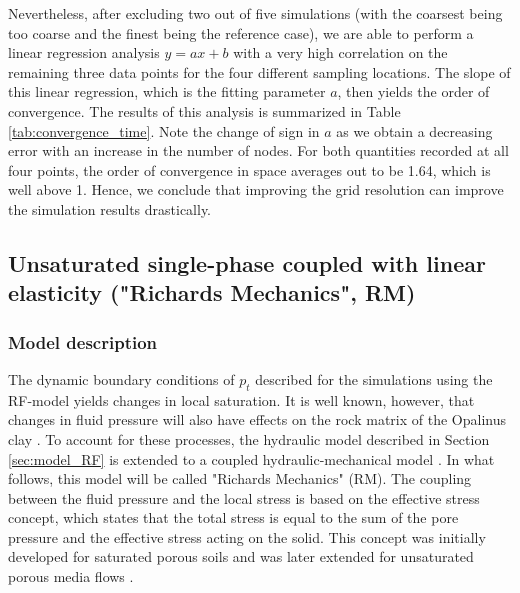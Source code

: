 Nevertheless, after excluding two out of five simulations (with the coarsest being too coarse and the finest being the reference case), we are able to perform a linear regression analysis $y = ax + b$ with a very high correlation on the remaining three data points for the four different sampling locations. The slope of this linear regression, which is the fitting parameter $a$, then yields the order of convergence. The results of this analysis is summarized in Table \ref{tab:convergence_time}. Note the change of sign in $a$ as we obtain a decreasing error with an increase in the number of nodes. For both quantities recorded at all four points, the order of convergence in space averages out to be 1.64, which is well above 1. Hence, we conclude that improving the grid resolution can improve the simulation results drastically.

\subsection{Unsaturated single-phase coupled with linear elasticity ("Richards Mechanics", RM)}\label{sec:RM}
\subsubsection{Model description}\label{sec:model_RM}
The dynamic boundary conditions of $p_t$ described for the simulations using the RF-model yields changes in local saturation. It is well known, however, that changes in fluid pressure will also have effects on the rock matrix of the Opalinus clay \cite{wild2017}. To account for these processes, the hydraulic model described in Section \ref{sec:model_RF} is extended to a coupled hydraulic-mechanical model \cite{lewis1998}. In what follows, this model will be called "Richards Mechanics" (RM). The coupling between the fluid pressure and the local stress is based on the effective stress concept, which states that the total stress is equal to the sum of the pore pressure and the effective stress acting on the solid. This concept was initially developed for saturated porous soils\cite{biot1941,terzaghi1943} and was later extended for unsaturated porous media flows \cite{bishop1963}. 

